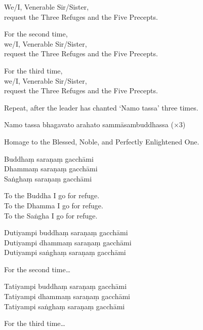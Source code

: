 \begin{english}
  We/I, Venerable Sir/Sister,\\
  request the Three Refuges and the Five Precepts.

  For the second time,\\
  we/I, Venerable Sir/Sister,\\
  request the Three Refuges and the Five Precepts.

  For the third time,\\
  we/I, Venerable Sir/Sister,\\
  request the Three Refuges and the Five Precepts.
\end{english}

\ifreferenceedition
\clearpage
\fi

\begin{instruction}
  Repeat, after the leader has chanted ‘Namo tassa’ three times.
\end{instruction}

Namo tassa bhagavato arahato sammāsambuddhassa (×3)

\begin{english}
  Homage to the Blessed, Noble, and Perfectly Enlightened One.
\end{english}

\ifhandbookedition
\clearpage
\fi

Buddhaṃ saraṇaṃ gacchāmi\\
Dhammaṃ saraṇaṃ gacchāmi\\
Saṅghaṃ saraṇaṃ gacchāmi

\begin{english}
  To the Buddha I go for refuge.\\
  To the Dhamma I go for refuge.\\
  To the Saṅgha I go for refuge.
\end{english}

Dutiyampi buddhaṃ saraṇaṃ gacchāmi\\
Dutiyampi dhammaṃ saraṇaṃ gacchāmi\\
Dutiyampi saṅghaṃ saraṇaṃ gacchāmi

\begin{english}
  For the second time\ldots
\end{english}

Tatiyampi buddhaṃ saraṇaṃ gacchāmi\\
Tatiyampi dhammaṃ saraṇaṃ gacchāmi\\
Tatiyampi saṅghaṃ saraṇaṃ gacchāmi

\begin{english}
  For the third time\ldots
\end{english}

